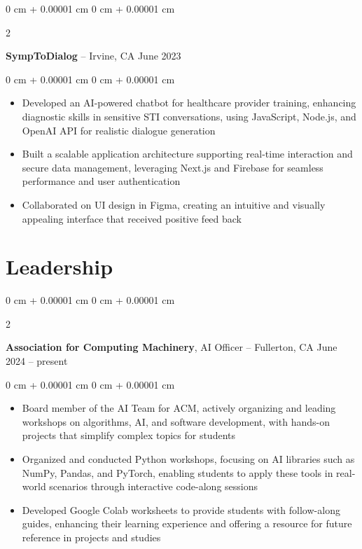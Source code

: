 \documentclass[10pt, letterpaper]{article}
\newenvironment{highlights}{
    \begin{itemize}[
        topsep=0.10 cm,
        parsep=0.10 cm,
        partopsep=0pt,
        itemsep=0pt,
        leftmargin=0 cm + 10pt
    ]
}{
    \end{itemize}
} %
\newenvironment{onecolentry}{
    \begin{adjustwidth}{
        0 cm + 0.00001 cm
    }{
        0 cm + 0.00001 cm
    }
}{
    \end{adjustwidth}
} %
\newenvironment{twocolentry}[2][]{
    \onecolentry
    \def\secondColumn{#2}
    \setcolumnwidth{\fill, 4.5 cm}
    \begin{paracol}{2}
}{
    \switchcolumn \raggedleft \secondColumn
    \end{paracol}
    \endonecolentry
} %
\begin{document}
        \vspace{0.2 cm}

        \begin{twocolentry}{
            June 2023
        }
            \textbf{SympToDialog} -- Irvine, CA\end{twocolentry}

        \vspace{0.10 cm}
        \begin{onecolentry}
            \begin{highlights}
                \item Developed an AI-powered chatbot for healthcare provider training, enhancing diagnostic skills in sensitive STI conversations, using JavaScript, Node.js, and OpenAI API for realistic dialogue generation
                \item Built a scalable application architecture supporting real-time interaction and secure data management, leveraging Next.js and Firebase for seamless performance and user authentication
                \item Collaborated on UI design in Figma, creating an intuitive and visually appealing interface that received positive feed back
            \end{highlights}
        \end{onecolentry}



    
    \section{Leadership}



        
        \begin{twocolentry}{
            June 2024 – present
        }
            \textbf{Association for Computing Machinery}, AI Officer -- Fullerton, CA\end{twocolentry}

        \vspace{0.10 cm}
        \begin{onecolentry}
            \begin{highlights}
                \item Board member of the AI Team for ACM, actively organizing and leading workshops on algorithms, AI, and software development, with hands-on projects that simplify complex topics for students
                \item Organized and conducted Python workshops, focusing on AI libraries such as NumPy, Pandas, and PyTorch, enabling students to apply these tools in real-world scenarios through interactive code-along sessions
                \item Developed Google Colab worksheets to provide students with follow-along guides, enhancing their learning experience and offering a resource for future reference in projects and studies
            \end{highlights}
        \end{onecolentry}
\end{document}
